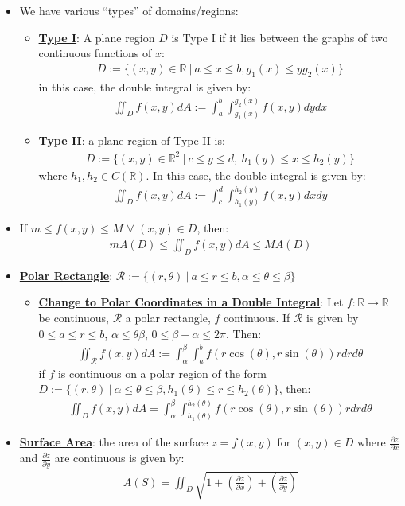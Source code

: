 \documentclass[11pt]{article}
\newcommand{\dfn}[1]{\underline{\textbf{#1}}}
\newcommand{\R}[0]{\mathbb{R}}
\begin{document}
\begin{itemize}
	 \item We have various ``types'' of domains/regions: 
	 \begin{itemize}
	 	\item \dfn{Type I}: A plane region $D$ is Type I if it lies between the graphs of two continuous functions of $x$: 
	 	\begin{align}
	 		D := \{ (x,y) \in \R\ |\ a \leq x \leq b, g_1(x) \leq y g_2(x) \} 	
	 	\end{align}
		in this case, the double integral is given by: 
		\begin{align}
			\iint_D f(x,y) dA := \int_a^b \int_{g_1(x)}^{g_2(x)} f(x,y) dy dx 	
		\end{align}
		\item \dfn{Type II}: a plane region of Type II is: 
		\begin{align}
			D := \{ (x,y) \in \R^2\ |\ c \leq y \leq d,\ h_1(y) \leq x \leq h_2(y) \}	
		\end{align}
		where $h_1, h_2 \in C(\R)$. In this case, the double integral is given by: 
		\begin{align*}
			\iint_D f(x,y) dA := \int_c^d \int_{h_1(y)}^{h_2(y)} f(x,y) dx dy
		\end{align*}
	 \end{itemize}
	 \item If $m \leq f(x,y) \leq M$ $\forall$ $(x,y) \in D$, then: 
	 \begin{align}
	 	mA(D) \leq \iint_D f(x,y) dA \leq M A(D) 	
	 \end{align}
	\item \dfn{Polar Rectangle}: $\mathcal{R} := \{ (r, \theta)\ |\ a \leq r \leq b, \alpha \leq \theta \leq \beta \}$ 
	\begin{itemize}
		\item \dfn{Change to Polar Coordinates in a Double Integral}: Let $f: \R \rightarrow \R$ be continuous, $\mathcal{R}$ a polar rectangle, $f$ continuous. If $\mathcal{R}$ is given by $0 \leq a \leq r \leq b$, $\alpha \leq \theta \beta$, $0 \leq \beta - \alpha \leq 2 \pi $. Then: 
		\begin{align}
			\iint_{\mathcal{R}} f(x,y) dA := \int_\alpha^\beta \int_a^b f ( r \cos (\theta), r \sin (\theta)) r dr d \theta 	
		\end{align}
		if $f$ is continuous on a polar region of the form $D := \{ (r, \theta)\ |\ \alpha \leq \theta \leq \beta, h_1(\theta) \leq r \leq h_2(\theta) \}$, then: 
		\begin{align}
			\iint_D f(x,y) dA = \int_{\alpha}^{\beta} \int_{h_1(\theta)}^{h_2(\theta)} f(r \cos (\theta), r \sin (\theta) ) r dr d \theta 	
		\end{align}
	\end{itemize}
	\item \dfn{Surface Area}: the area of the surface $z = f(x,y)$ for $(x,y) \in D $ where $\frac{\partial z}{\partial x}$ and $\frac{\partial z}{\partial y}$ are continuous is given by: 
	\begin{align}
		A(S) = \iint_D \sqrt{1 +  \left( \frac{\partial z}{\partial x} \right)  + \left( \frac{\partial z}{\partial y} \right) }	
	\end{align}	
\end{itemize}
\end{document}
